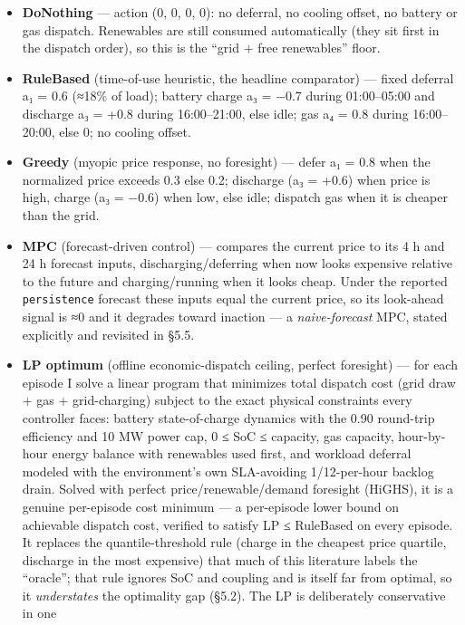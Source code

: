 \documentclass[
  11pt,
]{article}
\providecommand{\tightlist}{%
  \setlength{\itemsep}{0pt}\setlength{\parskip}{0pt}}
\begin{document}
\begin{itemize}
\tightlist
\item
  \textbf{DoNothing} --- action (0, 0, 0, 0): no deferral, no cooling
  offset, no battery or gas dispatch. Renewables are still consumed
  automatically (they sit first in the dispatch order), so this is the
  ``grid + free renewables'' floor.
\item
  \textbf{RuleBased} (time-of-use heuristic, the headline comparator)
  --- fixed deferral a₁ = 0.6 (≈18\% of load); battery charge a₃ = −0.7
  during 01:00--05:00 and discharge a₃ = +0.8 during 16:00--21:00, else
  idle; gas a₄ = 0.8 during 16:00--20:00, else 0; no cooling offset.
\item
  \textbf{Greedy} (myopic price response, no foresight) --- defer a₁ =
  0.8 when the normalized price exceeds 0.3 else 0.2; discharge (a₃ =
  +0.6) when price is high, charge (a₃ = −0.6) when low, else idle;
  dispatch gas when it is cheaper than the grid.
\item
  \textbf{MPC} (forecast-driven control) --- compares the current price
  to its 4 h and 24 h forecast inputs, discharging/deferring when now
  looks expensive relative to the future and charging/running when it
  looks cheap. Under the reported \texttt{persistence} forecast these
  inputs equal the current price, so its look-ahead signal is ≈0 and it
  degrades toward inaction --- a \emph{naive-forecast} MPC, stated
  explicitly and revisited in §5.5.
\item
  \textbf{LP optimum} (offline economic-dispatch ceiling, perfect
  foresight) --- for each episode I solve a linear program that
  minimizes total dispatch cost (grid draw + gas + grid-charging)
  subject to the exact physical constraints every controller faces:
  battery state-of-charge dynamics with the 0.90 round-trip efficiency
  and 10 MW power cap, 0 ≤ SoC ≤ capacity, gas capacity, hour-by-hour
  energy balance with renewables used first, and workload deferral
  modeled with the environment's own SLA-avoiding 1/12-per-hour backlog
  drain. Solved with perfect price/renewable/demand foresight (HiGHS),
  it is a genuine per-episode cost minimum --- a per-episode lower bound
  on achievable dispatch cost, verified to satisfy LP ≤ RuleBased on
  every episode. It replaces the quantile-threshold rule (charge in the
  cheapest price quartile, discharge in the most expensive) that much of
  this literature labels the ``oracle''; that rule ignores SoC and
  coupling and is itself far from optimal, so it \emph{understates} the
  optimality gap (§5.2). The LP is deliberately conservative in one

\end{itemize}
\end{document}

